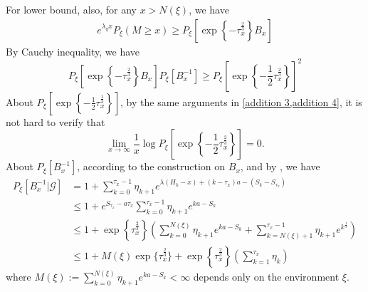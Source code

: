 \documentclass[]{article}
\numberwithin{equation}{section}
\theoremstyle{thmstyleone}%
\theoremstyle{thmstyletwo}%
\theoremstyle{thmstylethree}%
\theoremstyle{thmstylefour}%
\theoremstyle{thmstylefive}%
\theoremstyle{thmstylesix}%
\begin{document}
	For lower bound, also, for any $x>N(\xi)$, we have
	\begin{align}\label{addition 9}
		e^{\lambda_q x} P_\xi (M\geqslant x)
		\geqslant
		P_\xi\left[ \exp\left\{-\tau_x^{\frac{2}{3}}\right\} B_x\right]
	\end{align}
	By Cauchy inequality, we have
	\begin{equation}\label{addition 7}
		P_\xi\left[ \exp\left\{-\tau_x^{\frac{2}{3}}\right\} B_x\right]
		P_\xi\left[B_x^{-1}\right] \geqslant
		P_\xi\left[ \exp\left\{-\frac{1}{2}\tau_x^{\frac{2}{3}}\right\} \right]^2
	\end{equation}
	About $P_\xi\left[ \exp\left\{-\frac{1}{2}\tau_x^{\frac{1}{3}}\right\} \right]$, by the same arguments in \cref{addition 3,addition 4}, it is not hard to verify that
	\begin{equation}\label{addition 8}
		\lim\limits_{x\rightarrow\infty} \frac{1}{x}\log P_\xi\left[ \exp\left\{-\frac{1}{2}\tau_x^{\frac{2}{3}}\right\} \right] = 0.
	\end{equation}
	About $P_\xi\left[B_x^{-1}\right]$, according to the construction on $B_x$, and by , we have
	\begin{align}
		P_\xi[B_x^{-1}|\mathcal{G}] &= 1+\sum_{k=0}^{\tau_x-1} \eta_{k+1}e^{\lambda(H_k-x)+(k-\tau_x)a-(S_k-S_{\tau_x})}
		\nonumber\\
		&\leqslant
		1+e^{S_{\tau_x}-a\tau_x}\sum_{k=0}^{\tau_x-1} \eta_{k+1}e^{ka-S_k}\nonumber\\
		&\leqslant
		1+\exp\left\{\tau_x^{\frac{2}{3}}\right\} \left(\sum_{k=0}^{N(\xi)} \eta_{k+1}e^{ka-S_k}+\sum_{k=N(\xi)+1}^{\tau_x-1} \eta_{k+1}e^{k^{\frac{1}{3}}}\right)
		\nonumber\\
		&\leqslant
		1+ M(\xi) \exp\{\tau_x^{\frac{2}{3}}\}
		+\exp\left\{\tau_x^{\frac{2}{3}}\right\} \left(\sum\limits_{k=1}^{\tau_x} \eta_{k}\right)\label{addition 5}
	\end{align}
	where $M(\xi):= \sum\limits_{k=0}^{N(\xi)} \eta_{k+1}e^{ka-S_k}<\infty$ depends only on the environment $\xi$.
	
\end{document}
